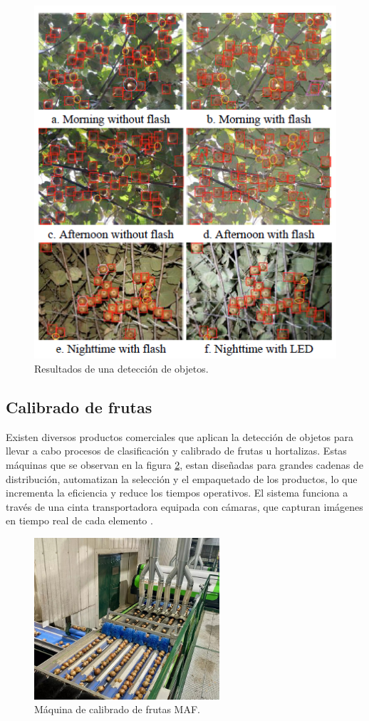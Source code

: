 
\begin{figure}[htbp]
	\centering
	\includegraphics[width=.5\textwidth]{./Figures/Song2019.png}
	\caption{Resultados de una detección de objetos\protect\footnotemark.}
	\label{fig:Song2019}
\end{figure}


\subsection{Calibrado de frutas}

Existen diversos productos comerciales que aplican la detección de objetos para llevar a cabo procesos de clasificación y calibrado de frutas u hortalizas. Estas máquinas que se observan en la figura \ref{fig:calibrado_de_frutas}, estan diseñadas para grandes cadenas de distribución, automatizan la selección y el empaquetado de los productos, lo que incrementa la eficiencia y reduce los tiempos operativos. El sistema funciona a través de una cinta transportadora equipada con cámaras, que capturan imágenes en tiempo real de cada elemento \citep{WEBSITE:Unitec2024}.

\begin{figure}[h]
	\centering
	\includegraphics[width=.6\textwidth, height=6cm]{./Figures/calibrado_de_frutas.jpg}
	\caption{Máquina de calibrado de frutas MAF\protect\footnotemark.}
	\label{fig:calibrado_de_frutas}
\end{figure}

